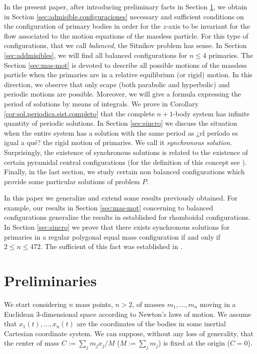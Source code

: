 \documentclass[smallcondensed]{svjour3}
\begin{document}
In the present paper, after introducing preliminary facts in Section \ref{sec:pre},   we
obtain in Section \ref{sec:admisible.configuraciones} necessary and sufficient conditions on the configuration of primary bodies in order for the $z$-axis to be invariant for the flow associated to the motion equations of the massless particle. For this type of configurations, that we call \emph{balanced}, the Sitnikov problem has sense.  In Section \ref{sec:addmisibles}, we will find all balanced configurations for $n\leq 4$ primaries.  The Section \ref{sec:mas-mot} is devoted to describe all possible motions of the massless particle when the primaries are in a relative equilibrium (or rigid) motion. In this direction, we observe that only scape (both parabolic and hyperbolic) and periodic motions are possible. Moreover, we will give a formula expressing the period of solutions  by means of integrals.  We prove in Corollary \ref{cor:sol.periodica.sist.completo} that the complete $n+1$-body system has  infinite quantity of periodic solutions. In Section  \ref{sec:sincro} we discuss the
situation when the entire system has a solution with the same period as {\color[rgb]{1,0,0}¿el per\'iodo es igual a qu\'e?} the rigid motion of primaries. We call it \emph{synchronous solution}. Surprisingly, the existence of synchronous solutions is related to the existence of certain pyramidal central configurations (for the definition of this concept see \cite{fayccal1996classification,faycaltesis,ouyang2004pyramidal}). Finally, in the last section, we study certain non balanced configurations which provide some particular solutions of problem $P$.

In this paper we generalize and extend some results previously obtained. For example, our results in Section \ref{sec:mas-mot} concerning to balanced configurations   generalize the results  in \cite{marchesin2013spatial} established for rhomboidal configurations. In Section \ref{sec:sincro} we prove that there exists synchronous solutions for primaries in a regular polygonal equal mass configuration if and only if $2\leq n\leq 472$. The sufficient of this fact was established in \cite{li2013characterization}.


\section{Preliminaries}\label{sec:pre}

We start considering $n$  mass points, $n>2$, of masses $m_1,\ldots,m_n$ moving in a Euclidean 3-dimensional space according to Newton's laws of motion. We assume that $x_1(t),\ldots,x_n(t)$ are the coordinates of the bodies in some inertial Cartesian coordinate system.  We can suppose, without any loss of generality, that the center of mass   $C:=\sum_jm_jx_j/M$ ($M:=\sum_j m_j$) is fixed at the origin ($C=0$).
\end{document}
